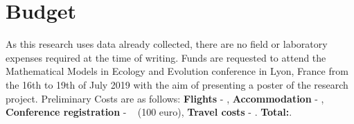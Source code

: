 \documentclass[11pt,usenames,dvipsnames]{article}
\begin{document}
\section{Budget}
As this research uses data already collected, there are no field or laboratory expenses required at the time of writing. Funds are requested to attend the Mathematical Models in Ecology and Evolution conference in Lyon, France from the 16th to 19th of July 2019 with the aim of presenting a poster of the research project. Preliminary Costs are as follows: \textbf{Flights} - , \textbf{Accommodation} - , \textbf{Conference registration} - ~ (100 euro), \textbf{Travel costs} - . \textbf{Total:}.
\end{document}
